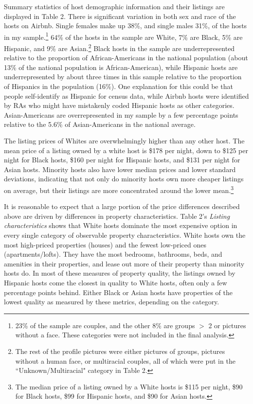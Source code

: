 \documentclass[11pt, oneside]{article}
\begin{document}
Summary statistics of host demographic information and their listings are displayed in Table 2. There is significant variation in both sex and race of the hosts on Airbnb. Single females make up 38\%, and single males 31\%, of the hosts in my sample.\footnote{23\% of the sample are couples, and the other 8\% are groups $>$ 2 or pictures without a face. These categories were not included in the final analysis.} 64\% of the hosts in the sample are White, 7\% are Black, 5\% are Hispanic, and 9\% are Asian.\footnote{The rest of the profile pictures were either pictures of groups, pictures without a human face, or multiracial couples, all of which were put in the ``Unknown/Multiracial" category in Table 2.} Black hosts in the sample are underrepresented relative to the proportion of African-Americans in the national population (about 13\% of the national population is African-American), while Hispanic hosts are underrepresented by about three times in this sample relative to the proportion of Hispanics in the population (16\%). One explanation for this could be that people self-identify as Hispanic for census data, while Airbnb hosts were identified by RAs who might have mistakenly coded Hispanic hosts as other categories. Asian-Americans are overrepresented in my sample by a few percentage points relative to the 5.6\% of Asian-Americans in the national average.\cite{census} 

The listing prices of Whites are overwhelmingly higher than any other host. The mean price of a listing owned by a white host is \$178 per night, down to \$125 per night for Black hosts, \$160 per night for Hispanic hosts, and \$131 per night for Asian hosts. Minority hosts also have lower median prices and lower standard deviations, indicating that not only do minority hosts own more cheaper listings on average, but their listings are more concentrated around the lower mean.\footnote{The median price of a listing owned by a White hosts is \$115 per night, \$90 for Black hosts, \$99 for Hispanic hosts, and \$90 for Asian hosts.} 

It is reasonable to expect that a large portion of the price differences described above are driven by differences in property characteristics. Table 2's \textit{Listing characteristics} shows that White hosts dominate the most expensive option in every single category of observable property characteristics. White hosts own the most high-priced properties (houses) and the fewest low-priced ones (apartments/lofts). They have the most bedrooms, bathrooms, beds, and amenities in their properties, and lease out more of their property than minority hosts do. In most of these measures of property quality, the listings owned by Hispanic hosts come the closest in quality to White hosts, often only a few percentage points behind. Either Black or Asian hosts have properties of the lowest quality as measured by these metrics, depending on the category. 
\end{document}
